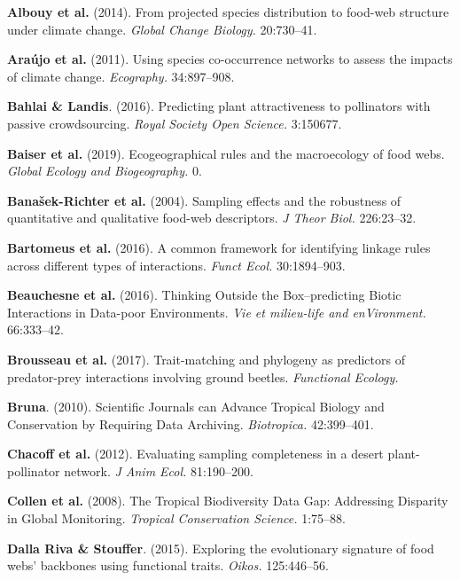 \leavevmode\hypertarget{ref-AlboVele14}{}%
\textbf{Albouy et al.} (2014). From projected species distribution to
food-web structure under climate change. \emph{Global Change Biology.}
20:730--41.

\leavevmode\hypertarget{ref-ArauRoze11}{}%
\textbf{Araújo et al.} (2011). Using species co-occurrence networks to
assess the impacts of climate change. \emph{Ecography.} 34:897--908.

\leavevmode\hypertarget{ref-BahlLand16}{}%
\textbf{Bahlai \& Landis}. (2016). Predicting plant attractiveness to
pollinators with passive crowdsourcing. \emph{Royal Society Open
Science.} 3:150677.

\leavevmode\hypertarget{ref-BaisGrav19}{}%
\textbf{Baiser et al.} (2019). Ecogeographical rules and the
macroecology of food webs. \emph{Global Ecology and Biogeography.} 0.

\leavevmode\hypertarget{ref-BanaCatt04}{}%
\textbf{Banašek-Richter et al.} (2004). Sampling effects and the
robustness of quantitative and qualitative food-web descriptors. \emph{J
Theor Biol.} 226:23--32.

\leavevmode\hypertarget{ref-BartGrav16}{}%
\textbf{Bartomeus et al.} (2016). A common framework for identifying
linkage rules across different types of interactions. \emph{Funct Ecol.}
30:1894--903.

\leavevmode\hypertarget{ref-BeauDesj16}{}%
\textbf{Beauchesne et al.} (2016). Thinking Outside the Box--predicting
Biotic Interactions in Data-poor Environments. \emph{Vie et milieu-life
and enVironment.} 66:333--42.

\leavevmode\hypertarget{ref-BrouGrav17}{}%
\textbf{Brousseau et al.} (2017). Trait-matching and phylogeny as
predictors of predator-prey interactions involving ground beetles.
\emph{Functional Ecology.}

\leavevmode\hypertarget{ref-Brun10}{}%
\textbf{Bruna}. (2010). Scientific Journals can Advance Tropical Biology
and Conservation by Requiring Data Archiving. \emph{Biotropica.}
42:399--401.

\leavevmode\hypertarget{ref-ChacVazq12}{}%
\textbf{Chacoff et al.} (2012). Evaluating sampling completeness in a
desert plant-pollinator network. \emph{J Anim Ecol.} 81:190--200.

\leavevmode\hypertarget{ref-CollRam08}{}%
\textbf{Collen et al.} (2008). The Tropical Biodiversity Data Gap:
Addressing Disparity in Global Monitoring. \emph{Tropical Conservation
Science.} 1:75--88.

\leavevmode\hypertarget{ref-DallStou15}{}%
\textbf{Dalla Riva \& Stouffer}. (2015). Exploring the evolutionary
signature of food webs' backbones using functional traits. \emph{Oikos.}
125:446--56.

